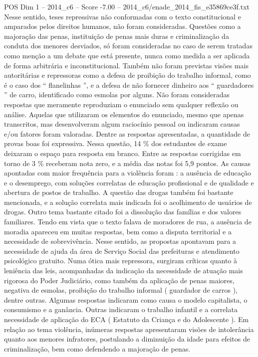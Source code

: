 \begin{textsample}{POS Dim 1 – 2014\_c6 – Score -7.00 – 2014\_c6/enade\_2014\_fis\_e35869ce3f.txt}
Nesse sentido, teses repressivas não conformadas com o texto constitucional e amparados pelos direitos humanos, não foram consideradas.
Questões como a majoração das penas, instituição de penas mais duras e criminalização da conduta dos menores desviados, só foram consideradas no caso de serem tratadas como menção a um debate que está presente, nunca como medida a ser aplicada de forma arbitrária e inconstitucional.
Também não foram previstas visões mais autoritárias e repressoras como a defesa de proibição do trabalho informal, como é o caso dos “ flanelinhas ”, e a defesa de não fornecer dinheiro aos “ guardadores ” de carro, identificado como esmolas por alguns.
Não foram consideradas respostas que meramente reproduziam o enunciado sem qualquer reflexão ou análise.
Aquelas que utilizaram os elementos do enunciado, mesmo que apenas transcritos, mas desenvolveram algum raciocínio pessoal ou indicaram causas e/ou fatores foram valoradas.
Dentre as respostas apresentadas, a quantidade de provas boas foi expressiva.
Nessa questão, 14 \% dos estudantes de exame deixaram o espaço para resposta em branco.
Entre as respostas corrigidas em torno de 3 \% receberam nota zero, e a média das notas foi 5,9 pontos.
As causas apontadas com maior frequência para a violência foram : a ausência de educação e o desemprego, com soluções correlatas de educação profissional e de qualidade e abertura de postos de trabalho.
A questão das drogas também foi bastante mencionada, e a solução correlata mais indicada foi o acolhimento de usuários de drogas.
Outro tema bastante citado foi a dissolução das famílias e dos valores familiares.
Tendo em vista que o texto falava de moradores de rua, a ausência de moradia apareceu em muitas respostas, bem como a disputa territorial e a necessidade de sobrevivência.
Nesse sentido, as propostas apontavam para a necessidade de ajuda da área de Serviço Social das prefeituras e atendimento psicológico gratuito.
Numa ótica mais repressora, surgiram críticas quanto à leniência das leis, acompanhadas da indicação da necessidade de atuação mais rigorosa do Poder Judiciário, como também da aplicação de penas maiores, negativa de esmolas, proibição do trabalho informal ( guardador de carros ), dentre outras.
Algumas respostas indicaram como causa o modelo capitalista, o consumismo e a ganância.
Outras indicaram o trabalho infantil e a correlata necessidade de aplicação do ECA ( Estatuto da Criança e do Adolescente ).
Em relação ao tema violência, inúmeras respostas apresentaram visões de intolerância quanto aos menores infratores, postulando a diminuição da idade para efeitos de criminalização, bem como defendendo a majoração de penas.

\end{textsample}
